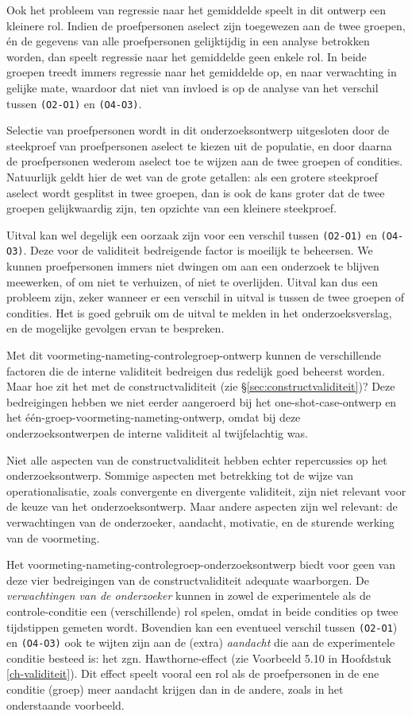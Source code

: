 \documentclass[
]{book}
\begin{document}
Ook het probleem van regressie naar het gemiddelde speelt in dit ontwerp
een kleinere rol. Indien de proefpersonen aselect zijn toegewezen aan de
twee groepen, én de gegevens van alle proefpersonen gelijktijdig in een
analyse betrokken worden, dan speelt regressie naar het gemiddelde geen
enkele rol. In beide groepen treedt immers regressie naar het gemiddelde
op, en naar verwachting in gelijke mate, waardoor dat niet van invloed
is op de analyse van het verschil tussen \texttt{(O2-O1)} en \texttt{(O4-O3)}.

Selectie van proefpersonen wordt in dit onderzoeksontwerp uitgesloten
door de steekproef van proefpersonen aselect te kiezen uit de populatie,
en door daarna de proefpersonen wederom aselect toe te wijzen aan de
twee groepen of condities. Natuurlijk geldt hier de wet van de grote
getallen: als een grotere steekproef aselect wordt gesplitst in twee
groepen, dan is ook de kans groter dat de twee groepen gelijkwaardig
zijn, ten opzichte van een kleinere steekproef.

Uitval kan wel degelijk een oorzaak zijn voor een verschil tussen
\texttt{(O2-O1)} en \texttt{(O4-O3)}. Deze voor de validiteit bedreigende factor
is moeilijk te beheersen. We kunnen proefpersonen immers niet dwingen om
aan een onderzoek te blijven meewerken, of om niet te verhuizen, of niet
te overlijden. Uitval kan dus een probleem zijn, zeker wanneer er een
verschil in uitval is tussen de twee groepen of condities. Het is goed
gebruik om de uitval te melden in het onderzoeksverslag, en de mogelijke
gevolgen ervan te bespreken.

Met dit voormeting-nameting-controlegroep-ontwerp kunnen de
verschillende factoren die de interne validiteit bedreigen dus redelijk
goed beheerst worden. Maar hoe zit het met de constructvaliditeit (zie
§\ref{sec:constructvaliditeit})? Deze bedreigingen hebben we niet
eerder aangeroerd bij het one-shot-case-ontwerp en het
één-groep-voormeting-nameting-ontwerp, omdat bij deze
onderzoeksontwerpen de interne validiteit al twijfelachtig was.

Niet alle aspecten van de constructvaliditeit hebben echter repercussies
op het onderzoeksontwerp. Sommige aspecten met betrekking tot de wijze
van operationalisatie, zoals convergente en divergente validiteit, zijn
niet relevant voor de keuze van het onderzoeksontwerp. Maar andere
aspecten zijn wel relevant: de verwachtingen van de onderzoeker,
aandacht, motivatie, en de sturende werking van de voormeting.

Het voormeting-nameting-controlegroep-onderzoeksontwerp biedt voor geen
van deze vier bedreigingen van de constructvaliditeit adequate
waarborgen. De \emph{verwachtingen van de onderzoeker} kunnen in zowel de
experimentele als de controle-conditie een (verschillende) rol spelen,
omdat in beide condities op twee tijdstippen gemeten wordt. Bovendien
kan een eventueel verschil tussen \texttt{(O2-O1}) en \texttt{(O4-O3)} ook te
wijten zijn aan de (extra) \emph{aandacht} die aan de experimentele conditie
besteed is: het zgn. Hawthorne-effect (zie Voorbeeld 5.10 in Hoofdstuk \ref{ch-validiteit}).
Dit effect speelt vooral een rol als de
proefpersonen in de ene conditie (groep) meer aandacht krijgen dan in de
andere, zoals in het onderstaande voorbeeld.
\end{document}
